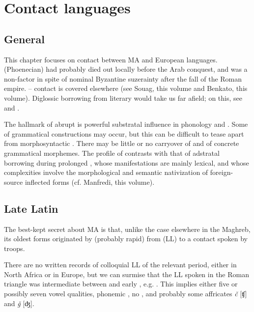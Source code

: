 \documentclass[output=paper]{langsci/langscibook}
\begin{document}
\section{Contact languages}

\subsection{General}

This chapter focuses on contact between MA and European languages.  (Phoenecian) had probably died out locally before the Arab conquest, and  was a non-factor in spite of nominal Byzantine suzerainty after the fall of the Roman empire. – contact is covered elsewhere (see Souag, this volume and Benkato, this volume). Diglossic borrowing from literary  would take us far afield; on this, see \citet{Sayahi2014} and \citet{Heath1989}.

The hallmark of abrupt  is powerful substratal influence in phonology and . Some  of grammatical constructions may occur, but this can be difficult to tease apart from morphosyntactic . There may be little or no carryover of  and of concrete grammatical morphemes. The profile of  contrasts with that of adstratal borrowing during prolonged , whose manifestations are mainly lexical, and whose complexities involve the morphological and semantic nativization of foreign-source inflected forms (cf. Manfredi, this volume).

\subsection{Late Latin}

The best-kept secret about MA is that, unlike the case elsewhere in the Maghreb, its oldest forms originated by  (probably rapid) from   (LL) to a contact  spoken by  troops.

There are no written records of colloquial LL of the relevant period, either in North Africa or in Europe, but we can surmise that the LL spoken in the Roman triangle was intermediate between   and early  , e.g.  . This implies either five or possibly seven vowel qualities, phonemic , no , and probably some affricates \textit{č} [ʧ] and \textit{ǧ} [ʤ].
\end{document}
